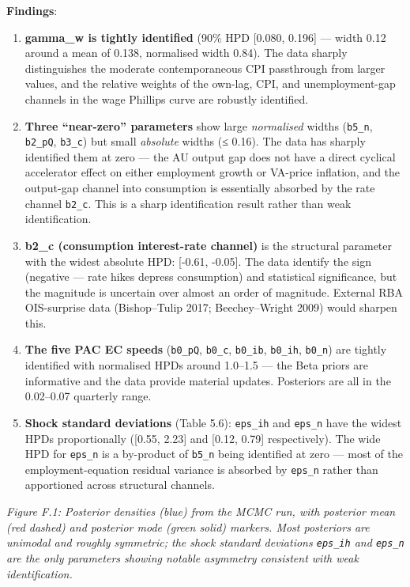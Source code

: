 \documentclass[
]{article}
\begin{document}
\textbf{Findings}:

\begin{enumerate}
\def\labelenumi{\arabic{enumi}.}
\item
  \textbf{gamma\_w is tightly identified} (90\% HPD {[}0.080, 0.196{]}
  --- width 0.12 around a mean of 0.138, normalised width 0.84). The
  data sharply distinguishes the moderate contemporaneous CPI
  passthrough from larger values, and the relative weights of the
  own-lag, CPI, and unemployment-gap channels in the wage Phillips curve
  are robustly identified.
\item
  \textbf{Three ``near-zero'' parameters} show large \emph{normalised}
  widths (\texttt{b5\_n}, \texttt{b2\_pQ}, \texttt{b3\_c}) but small
  \emph{absolute} widths (≤ 0.16). The data has sharply identified them
  at zero --- the AU output gap does not have a direct cyclical
  accelerator effect on either employment growth or VA-price inflation,
  and the output-gap channel into consumption is essentially absorbed by
  the rate channel \texttt{b2\_c}. This is a sharp identification result
  rather than weak identification.
\item
  \textbf{b2\_c (consumption interest-rate channel)} is the structural
  parameter with the widest absolute HPD: {[}-0.61, -0.05{]}. The data
  identify the sign (negative --- rate hikes depress consumption) and
  statistical significance, but the magnitude is uncertain over almost
  an order of magnitude. External RBA OIS-surprise data (Bishop--Tulip
  2017; Beechey--Wright 2009) would sharpen this.
\item
  \textbf{The five PAC EC speeds} (\texttt{b0\_pQ}, \texttt{b0\_c},
  \texttt{b0\_ib}, \texttt{b0\_ih}, \texttt{b0\_n}) are tightly
  identified with normalised HPDs around 1.0--1.5 --- the Beta priors
  are informative and the data provide material updates. Posteriors are
  all in the 0.02--0.07 quarterly range.
\item
  \textbf{Shock standard deviations} (Table 5.6): \texttt{eps\_ih} and
  \texttt{eps\_n} have the widest HPDs proportionally ({[}0.55, 2.23{]}
  and {[}0.12, 0.79{]} respectively). The wide HPD for \texttt{eps\_n}
  is a by-product of \texttt{b5\_n} being identified at zero --- most of
  the employment-equation residual variance is absorbed by
  \texttt{eps\_n} rather than apportioned across structural channels.
\end{enumerate}

\emph{Figure F.1: Posterior densities (blue) from the MCMC run, with
posterior mean (red dashed) and posterior mode (green solid) markers.
Most posteriors are unimodal and roughly symmetric; the shock standard
deviations \texttt{eps\_ih} and \texttt{eps\_n} are the only parameters
showing notable asymmetry consistent with weak identification.}
\end{document}
